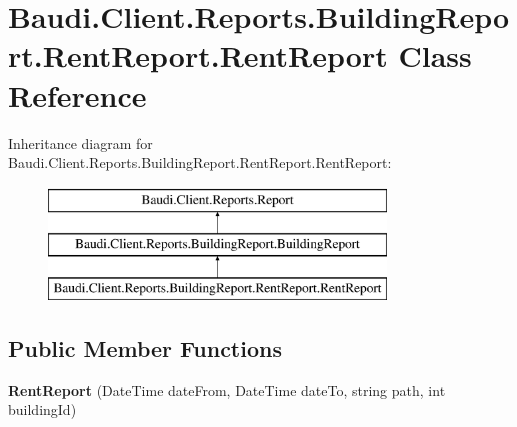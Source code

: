 \hypertarget{class_baudi_1_1_client_1_1_reports_1_1_building_report_1_1_rent_report_1_1_rent_report}{}\section{Baudi.\+Client.\+Reports.\+Building\+Report.\+Rent\+Report.\+Rent\+Report Class Reference}
\label{class_baudi_1_1_client_1_1_reports_1_1_building_report_1_1_rent_report_1_1_rent_report}
Inheritance diagram for Baudi.\+Client.\+Reports.\+Building\+Report.\+Rent\+Report.\+Rent\+Report\+:\begin{figure}[H]
\begin{center}
\leavevmode
\includegraphics[height=3.000000cm]{class_baudi_1_1_client_1_1_reports_1_1_building_report_1_1_rent_report_1_1_rent_report}
\end{center}
\end{figure}
\subsection*{Public Member Functions}
\begin{DoxyCompactItemize}
\item 
\hypertarget{class_baudi_1_1_client_1_1_reports_1_1_building_report_1_1_rent_report_1_1_rent_report_ae09ae815b9a95519fd290ad647c92fac}{}{\bfseries Rent\+Report} (Date\+Time date\+From, Date\+Time date\+To, string path, int building\+Id)\label{class_baudi_1_1_client_1_1_reports_1_1_building_report_1_1_rent_report_1_1_rent_report_ae09ae815b9a95519fd290ad647c92fac}

\end{DoxyCompactItemize}
